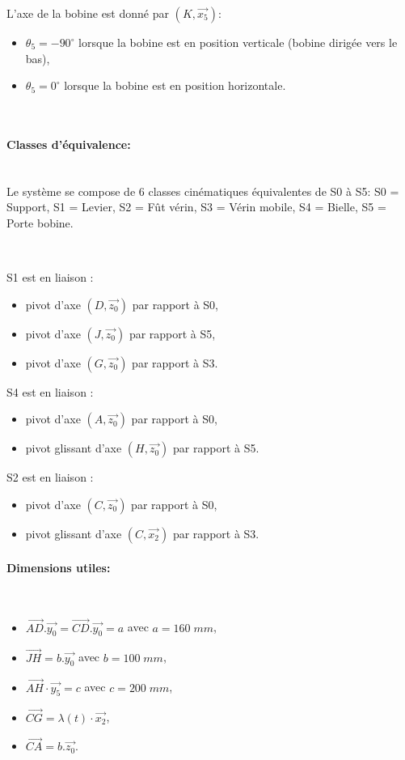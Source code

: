 L'axe de la bobine est donné par $(K,\overrightarrow{x_5})$:
\begin{itemize}
  \item $\theta_5=-90^{\circ}$ lorsque la bobine est en position verticale (bobine dirigée vers le bas),
  \item $\theta_5=0^{\circ}$ lorsque la bobine est en position horizontale.
\end{itemize}
~\

\paragraph{Classes d'équivalence:} ~\ \\
Le système se compose de 6 classes cinématiques équivalentes de S0 à S5:
S0 = Support, S1 = Levier, S2 = Fût vérin, S3 = Vérin mobile, S4 = Bielle, S5 = Porte bobine.

~\

\begin{minipage}[t]{0.45\linewidth}
S1 est en liaison :
\begin{itemize}
 \item pivot d'axe $(D,\overrightarrow{z_0})$ par rapport à S0,
 \item pivot d'axe $(J,\overrightarrow{z_0})$ par rapport à S5,
 \item pivot d'axe  $(G,\overrightarrow{z_0})$ par rapport à S3.
\end{itemize}

S4 est en liaison :
\begin{itemize}
 \item pivot d'axe  $(A,\overrightarrow{z_0})$ par rapport à S0,
 \item pivot glissant d'axe  $(H,\overrightarrow{z_0})$ par rapport à S5.
\end{itemize}
\end{minipage}\hfill
\begin{minipage}[t]{0.45\linewidth}
S2 est en liaison :
\begin{itemize}
 \item pivot d'axe $(C,\overrightarrow{z_0})$ par rapport à S0,
 \item pivot glissant d'axe $(C,\overrightarrow{x_2})$ par rapport à S3.
\end{itemize}
\end{minipage}

\paragraph{Dimensions utiles:} ~\
\begin{itemize}
 \item $\overrightarrow{AD}.\overrightarrow{y_0}=\overrightarrow{CD}.\overrightarrow{y_0}=a$ avec $a=160\;mm$,
 \item $\overrightarrow{JH}=b.\overrightarrow{y_0}$ avec $b=100\;mm$,
 \item $\overrightarrow{AH}\cdot \overrightarrow{y_5}=c$ avec $c=200\;mm$,
 \item $\overrightarrow{CG}=\lambda(t)\cdot\overrightarrow{x_2}$,
 \item $\overrightarrow{CA}=b.\overrightarrow{z_0}$.
\end{itemize}


